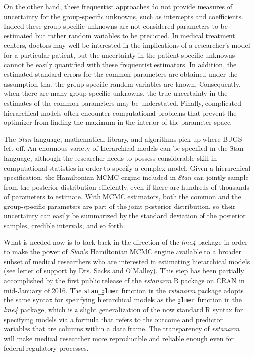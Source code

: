\documentclass[11pt,notitlepage]{article}
\begin{document}
On the other hand, these frequentist approaches do not provide measures of uncertainty for the
group-specific unknowns, such as intercepts and coefficients. Indeed these group-specific
unknowns are not considered parameters to be estimated but rather random variables to be
predicted. In medical treatment centers, doctors may well be interested in the implications
of a researcher's model for a particular patient, but the uncertainty in the patient-specific
unknowns cannot be easily quantified with these frequentist estimators. In addition, the 
estimated standard errors for the common parameters are obtained under the assumption that
the group-specific random variables are known. Consequently, when there are many group-specific
unknowns, the true uncertainty in the estimates of the common parameters may be understated. 
Finally, complicated hierarchical models often encounter computational problems that prevent
the optimizer from finding the maximum in the interior of the parameter space.

The \textit{Stan} language, mathematical library, and algorithms pick up where BUGS left off.
An enormous variety of hierarchical models can be specified in the Stan language, although the
researcher needs to possess considerable skill in computational statistics in order to specify
a complex model. Given a hierarchical specification, the Hamiltonian MCMC engine included in \textit{Stan}
can jointly sample from the posterior distribution efficiently, even if there are hundreds of thousands
of parameters to estimate. With MCMC estimators, both the common and the group-specific parameters
are part of the joint posterior distribution, so their uncertainty can easily be summarized by
the standard deviation of the posterior samples, credible intervals, and so forth.

What is needed now is to tack back in the direction of the \textit{lme4} package in order to
make the power of \textit{Stan}'s Hamiltonian MCMC engine available to a broader subset of medical
researchers who are interested in estimating hierarchical models (see letter of support 
by Drs. Sacks and O'Malley). This step has been partially accomplished
by the first public release of the \textit{rstanarm} R package on CRAN in mid-January of 2016. The 
\texttt{stan\_glmer} function in the \textit{rstanarm} package adopts the same syntax for specifying hierarchical
models as the \texttt{glmer} function in the \textit{lme4} package, which is a slight generalization
of the now standard R syntax for specifying models via a formula that refers to the outcome and 
predictor variables that are columns within a data.frame. The transparency of \textit{rstanarm} will 
make medical researcher more reproducible and reliable enough even for federal regulatory processes. 
\end{document}

